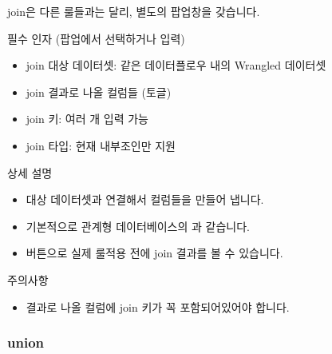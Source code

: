 \documentclass[letterpaper,10pt,english]{sphinxmanual}
\begin{document}
join은 다른 룰들과는 달리, 별도의 팝업창을 갖습니다.

필수 인자 (팝업에서 선택하거나 입력)
\begin{itemize}
\item {} 
join 대상 데이터셋: 같은 데이터플로우 내의 Wrangled 데이터셋

\item {} 
join 결과로 나올 컬럼들 (토글)

\item {} 
join 키: 여러 개 입력 가능

\item {} 
join 타입: 현재 내부조인만 지원

\end{itemize}

상세 설명
\begin{itemize}
\item {} 
대상 데이터셋과 연결해서 컬럼들을 만들어 냅니다.

\item {} 
기본적으로 관계형 데이터베이스의 과 같습니다.

\item {} 
 버튼으로 실제 룰적용 전에 join 결과를 볼 수 있습니다.

\end{itemize}

주의사항
\begin{itemize}
\item {} 
결과로 나올 컬럼에 join 키가 꼭 포함되어있어야 합니다.
\begin{quote}

\begin{figure}[H]
\centering

\noindent{}
\end{figure}
\end{quote}

\end{itemize}


\subsubsection{union}
\label{\detokenize{discovery/part07/rule_kinds:union}}
\begin{figure}[H]
\centering

\noindent{}
\end{figure}
\end{document}
